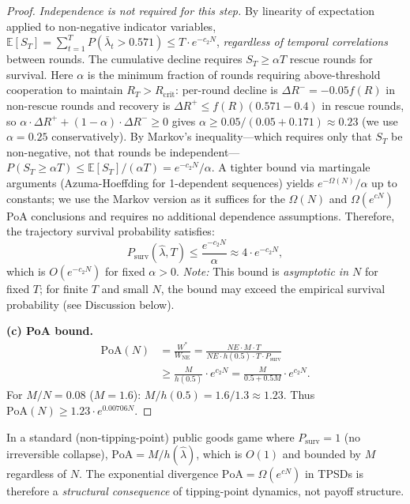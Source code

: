 \begin{proof}
\emph{Independence is not required for this step.} By linearity of expectation applied to non-negative indicator variables, $\mathbb{E}[S_T] = \sum_{t=1}^T P(\bar{\lambda}_t > 0.571) \leq T \cdot e^{-c_2 N}$, \emph{regardless of temporal correlations} between rounds. The cumulative decline requires $S_T \geq \alpha T$ rescue rounds for survival. Here $\alpha$ is the minimum fraction of rounds requiring above-threshold cooperation to maintain $R_T > R_{\mathrm{crit}}$: per-round decline is $\Delta R^{-} = -0.05 f(R)$ in non-rescue rounds and recovery is $\Delta R^{+} \leq f(R)(0.571 - 0.4)$ in rescue rounds, so $\alpha \cdot \Delta R^{+} + (1{-}\alpha) \cdot \Delta R^{-} \geq 0$ gives $\alpha \geq 0.05/(0.05 + 0.171) \approx 0.23$ (we use $\alpha = 0.25$ conservatively). By Markov's inequality---which requires only that $S_T$ be non-negative, not that rounds be independent---$P(S_T \geq \alpha T) \leq \mathbb{E}[S_T]/(\alpha T) = e^{-c_2 N}/\alpha$. A tighter bound via martingale arguments (Azuma-Hoeffding for 1-dependent sequences) yields $e^{-\Omega(N)}/\alpha$ up to constants; we use the Markov version as it suffices for the $\Omega(N)$ and $\Omega(e^{cN})$ PoA conclusions and requires no additional dependence assumptions. Therefore, the trajectory survival probability satisfies:
\[
  P_{\mathrm{surv}}(\hat{\lambda}, T) \leq \frac{e^{-c_2 N}}{\alpha} \approx 4 \cdot e^{-c_2 N},
\]
which is $O(e^{-c_2 N})$ for fixed $\alpha > 0$. \emph{Note:} This bound is \emph{asymptotic in $N$} for fixed $T$; for finite $T$ and small $N$, the bound may exceed the empirical survival probability (see Discussion below).

\textbf{(c) PoA bound.}
\begin{align*}
  \mathrm{PoA}(N)
  &= \frac{W^*}{W_{\mathrm{NE}}}
  = \frac{NE \cdot M \cdot T}{NE \cdot h(0.5) \cdot T
    \cdot P_{\mathrm{surv}}} \\
  &\geq \frac{M}{h(0.5)} \cdot e^{c_2 N}
  = \frac{M}{0.5 + 0.5M} \cdot e^{c_2 N}.
\end{align*}
For $M/N = 0.08$ ($M = 1.6$):
$M / h(0.5) = 1.6 / 1.3 \approx 1.23$.
Thus $\mathrm{PoA}(N) \geq 1.23 \cdot e^{0.00706 N}$.
\end{proof}

\begin{corollary}
\label{cor:poa_contrast}
In a standard (non-tipping-point) public goods game where
$P_{\mathrm{surv}} = 1$ (no irreversible collapse),
$\mathrm{PoA} = M / h(\hat{\lambda})$,
which is $O(1)$ and bounded by $M$
regardless of $N$.
The exponential divergence $\mathrm{PoA} = \Omega(e^{cN})$
in TPSDs is therefore a \emph{structural consequence}
of tipping-point dynamics, not payoff structure.
\end{corollary}

